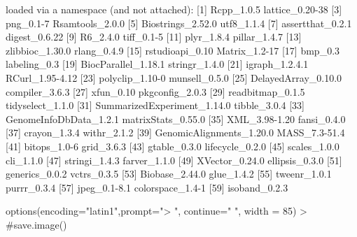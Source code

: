 \documentclass[a4paper,10pt]{article}
\begin{document}
\begin{Schunk}
\begin{Soutput}
loaded via a namespace (and not attached):
 [1] Rcpp_1.0.5                  lattice_0.20-38            
 [3] png_0.1-7                   Rsamtools_2.0.0            
 [5] Biostrings_2.52.0           utf8_1.1.4                 
 [7] assertthat_0.2.1            digest_0.6.22              
 [9] R6_2.4.0                    tiff_0.1-5                 
[11] plyr_1.8.4                  pillar_1.4.7               
[13] zlibbioc_1.30.0             rlang_0.4.9                
[15] rstudioapi_0.10             Matrix_1.2-17              
[17] bmp_0.3                     labeling_0.3               
[19] BiocParallel_1.18.1         stringr_1.4.0              
[21] igraph_1.2.4.1              RCurl_1.95-4.12            
[23] polyclip_1.10-0             munsell_0.5.0              
[25] DelayedArray_0.10.0         compiler_3.6.3             
[27] xfun_0.10                   pkgconfig_2.0.3            
[29] readbitmap_0.1.5            tidyselect_1.1.0           
[31] SummarizedExperiment_1.14.0 tibble_3.0.4               
[33] GenomeInfoDbData_1.2.1      matrixStats_0.55.0         
[35] XML_3.98-1.20               fansi_0.4.0                
[37] crayon_1.3.4                withr_2.1.2                
[39] GenomicAlignments_1.20.0    MASS_7.3-51.4              
[41] bitops_1.0-6                grid_3.6.3                 
[43] gtable_0.3.0                lifecycle_0.2.0            
[45] scales_1.0.0                cli_1.1.0                  
[47] stringi_1.4.3               farver_1.1.0               
[49] XVector_0.24.0              ellipsis_0.3.0             
[51] generics_0.0.2              vctrs_0.3.5                
[53] Biobase_2.44.0              glue_1.4.2                 
[55] tweenr_1.0.1                purrr_0.3.4                
[57] jpeg_0.1-8.1                colorspace_1.4-1           
[59] isoband_0.2.3              
\end{Soutput}
\begin{Sinput}
  options(encoding="latin1",prompt=">  ", continue=" ", width = 85)
>  #save.image()
\end{Sinput}
\end{Schunk}
\end{document}

